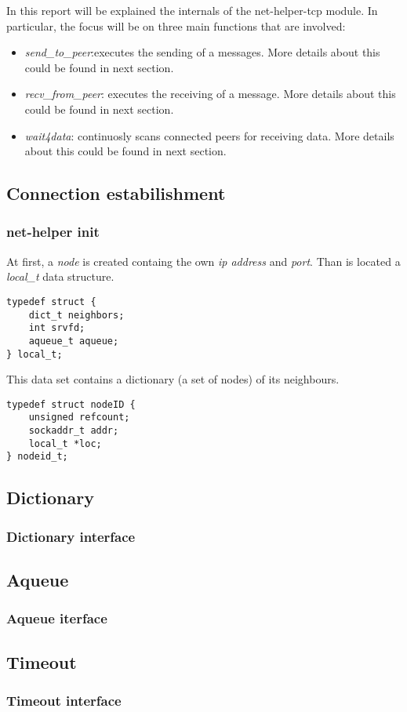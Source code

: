 In this report will be explained the internals of the net-helper-tcp module.
In particular, the focus will be on three main functions that are involved:
\begin{itemize}
  \item \textit{send\_to\_peer}:executes the sending of a messages. More details about
    this could be found in next section.
  \item \textit{recv\_from\_peer}: executes the receiving of a message. More details about
    this could be found in next section.
  \item \textit{wait4data}:  continuosly scans connected peers for receiving data.
    More details about this could be found in next section.
\end{itemize}


\subsection{Connection estabilishment}

\subsubsection{net-helper init}
At first, a \textit{node} is created containg the own \textit{ip address} and \textit{port}. Than is located a
\textit{local\_t} data structure.
\begin{lstlisting}
typedef struct {
    dict_t neighbors;
    int srvfd;
    aqueue_t aqueue;
} local_t;
\end{lstlisting}
This data set contains a dictionary (a set of nodes) of its neighbours. 

\begin{lstlisting}
typedef struct nodeID {
    unsigned refcount;
    sockaddr_t addr;
    local_t *loc;
} nodeid_t;
\end{lstlisting}

\subsection{Dictionary}


\subsubsection{Dictionary interface}

\subsection{Aqueue}

\subsubsection{Aqueue iterface}

\subsection{Timeout}

\subsubsection{Timeout interface}



\begin{lstlisting}

\end{lstlisting}
